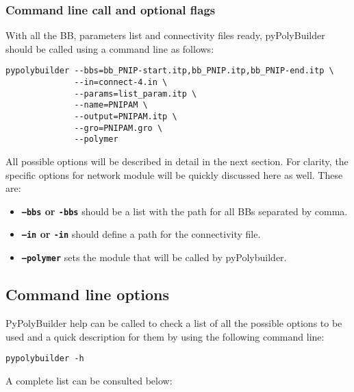 \documentclass[12pt]{article}
\begin{document}
\subsubsection{Command line call and optional flags}
With all the BB, parameters list and connectivity files ready, pyPolyBuilder should be called using a command line as follows:

\begin{lstlisting}
pypolybuilder --bbs=bb_PNIP-start.itp,bb_PNIP.itp,bb_PNIP-end.itp \
              --in=connect-4.in \
              --params=list_param.itp \
              --name=PNIPAM \
              --output=PNIPAM.itp \
              --gro=PNIPAM.gro \
              --polymer
\end{lstlisting}

All possible options will be described in detail in the next section.
For clarity, the specific options for network module will be quickly discussed here as well.
These are:
\begin{itemize}
    \item \textbf{\texttt{--bbs} or \texttt{-bbs}} should be a list with the path for all BBs separated by comma.
    
    \item \textbf{\texttt{--in} or \texttt{-in}} should define a path for the connectivity file.
    
    \item \textbf{\texttt{--polymer}} sets the module that will be called by pyPolybuilder.
\end{itemize}

\subsection{Command line options}
\label{sec:CommandLine}

PyPolyBuilder help can be called to check a list of all the possible options to be used and a quick description for them by using the following command line:

\begin{lstlisting}
pypolybuilder -h
\end{lstlisting}

A complete list can be consulted below:
\end{document}
